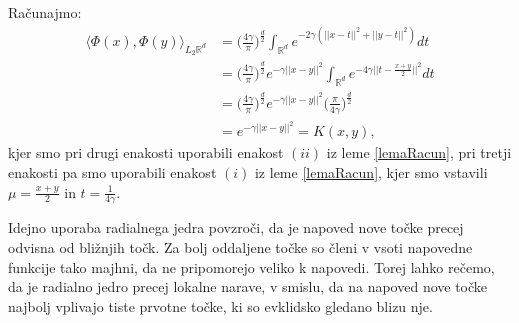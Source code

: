 \documentclass[mat1]{fmfdelo}
\newcommand{\R}{\mathbb R}
\begin{document}
\begin{dokaz}
	Računajmo:
	\begin{align*}
	\langle \Phi(x), \Phi(y) \rangle_{L_2{\R^d}} &= \Big(\frac{4\gamma}{\pi}\Big)^\frac{d}{2}\int_{\R^d}e^{-2\gamma(||x-t||^2 + ||y-t||^2)}dt \\
	&= \Big(\frac{4\gamma}{\pi}\Big)^\frac{d}{2}e^{-\gamma||x-y||^2}\int_{\R^d}e^{-4\gamma||t - \frac{x+y}{2}||^2}dt \\
	&= \Big(\frac{4\gamma}{\pi}\Big)^\frac{d}{2}e^{-\gamma||x-y||^2}\Big(\frac{\pi}{4\gamma}\Big)^\frac{d}{2}\\
	&= e^{-\gamma||x-y||^2} = K(x, y),
	\end{align*}
	kjer smo pri drugi enakosti uporabili enakost $(ii)$ iz leme \ref{lemaRacun}, pri tretji enakosti pa smo uporabili enakost $(i)$ iz leme \ref{lemaRacun}, kjer smo vstavili $\mu = \frac{x + y}{2}$ in $t = \frac{1}{4\gamma}$.
\end{dokaz}
Idejno uporaba radialnega jedra povzroči, da je napoved nove točke precej odvisna od bližnjih točk. Za bolj oddaljene točke so členi v vsoti napovedne funkcije tako majhni, da ne pripomorejo veliko k napovedi. Torej lahko rečemo, da je radialno jedro precej lokalne narave, v smislu, da na napoved nove točke najbolj vplivajo tiste prvotne točke, ki so evklidsko gledano blizu nje.  
\end{document}
